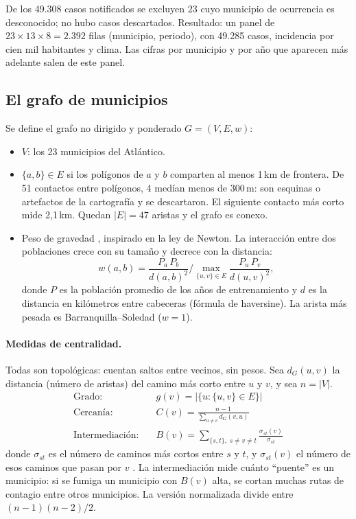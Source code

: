 \documentclass[11pt,letterpaper]{article}
\begin{document}
\noindent De los 49.308 casos notificados se excluyen 23 cuyo municipio de ocurrencia es desconocido; no hubo casos descartados. Resultado: un panel de $23 \times 13 \times 8 = 2.392$ filas (municipio, periodo), con 49.285 casos, incidencia por cien mil habitantes y clima. Las cifras por municipio y por año que aparecen más adelante salen de este panel.

\subsection{El grafo de municipios}
Se define el grafo no dirigido y ponderado $G=(V,E,w)$:
\begin{itemize}
  \item $V$: los 23 municipios del Atlántico.
  \item $\{a,b\}\in E$ si los polígonos de $a$ y $b$ comparten al menos 1\,km de frontera. De 51 contactos entre polígonos, 4 medían menos de 300\,m: son esquinas o artefactos de la cartografía y se descartaron. El siguiente contacto más corto mide 2,1\,km. Quedan $|E| = 47$ aristas y el grafo es conexo.
  \item Peso de gravedad \citep{xia2004}, inspirado en la ley de Newton. La interacción entre dos poblaciones crece con su tamaño y decrece con la distancia:
  \begin{equation}
    w(a,b) = \frac{P_a\,P_b}{d(a,b)^2}\Big/\max_{\{u,v\}\in E}\frac{P_u\,P_v}{d(u,v)^2},
  \end{equation}
  donde $P$ es la población promedio de los años de entrenamiento y $d$ es la distancia en kilómetros entre cabeceras (fórmula de haversine). La arista más pesada es Barranquilla–Soledad ($w=1$).
\end{itemize}

\paragraph{Medidas de centralidad.} Todas son topológicas: cuentan saltos entre vecinos, sin pesos. Sea $d_G(u,v)$ la distancia (número de aristas) del camino más corto entre $u$ y $v$, y sea $n=|V|$.
\begin{align}
  \text{Grado:}\quad & g(v) = |\{u : \{u,v\}\in E\}| \\
  \text{Cercanía:}\quad & C(v) = \frac{n-1}{\sum_{u\neq v} d_G(v,u)} \\
  \text{Intermediación:}\quad & B(v) = \sum_{\{s,t\},\; s\neq v\neq t} \frac{\sigma_{st}(v)}{\sigma_{st}}
\end{align}
donde $\sigma_{st}$ es el número de caminos más cortos entre $s$ y $t$, y $\sigma_{st}(v)$ el número de esos caminos que pasan por $v$ \citep{freeman1977}. La intermediación mide cuánto ``puente'' es un municipio: si se fumiga un municipio con $B(v)$ alta, se cortan muchas rutas de contagio entre otros municipios. La versión normalizada divide entre $(n-1)(n-2)/2$.
\end{document}

